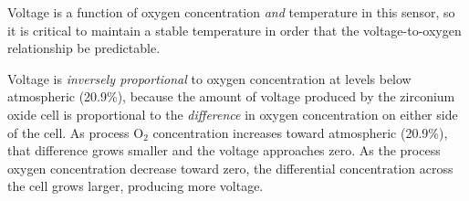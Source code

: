 





Voltage is a function of oxygen concentration {\it and} temperature in this sensor, so it is critical to maintain a stable temperature in order that the voltage-to-oxygen relationship be predictable.

\vskip 10pt

Voltage is {\it inversely proportional} to oxygen concentration at levels below atmospheric (20.9\%), because the amount of voltage produced by the zirconium oxide cell is proportional to the {\it difference} in oxygen concentration on either side of the cell.  As process O$_{2}$ concentration increases toward atmospheric (20.9\%), that difference grows smaller and the voltage approaches zero.  As the process oxygen concentration decrease toward zero, the differential concentration across the cell grows larger, producing more voltage.




